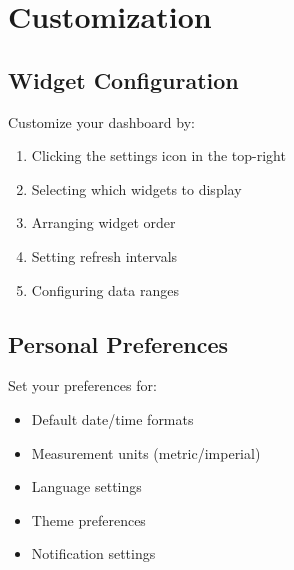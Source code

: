 \section{Customization}

\subsection{Widget Configuration}

Customize your dashboard by:
\begin{enumerate}
    \item Clicking the settings icon in the top-right
    \item Selecting which widgets to display
    \item Arranging widget order
    \item Setting refresh intervals
    \item Configuring data ranges
\end{enumerate}

\subsection{Personal Preferences}

Set your preferences for:
\begin{itemize}
    \item Default date/time formats
    \item Measurement units (metric/imperial)
    \item Language settings
    \item Theme preferences
    \item Notification settings
\end{itemize}
